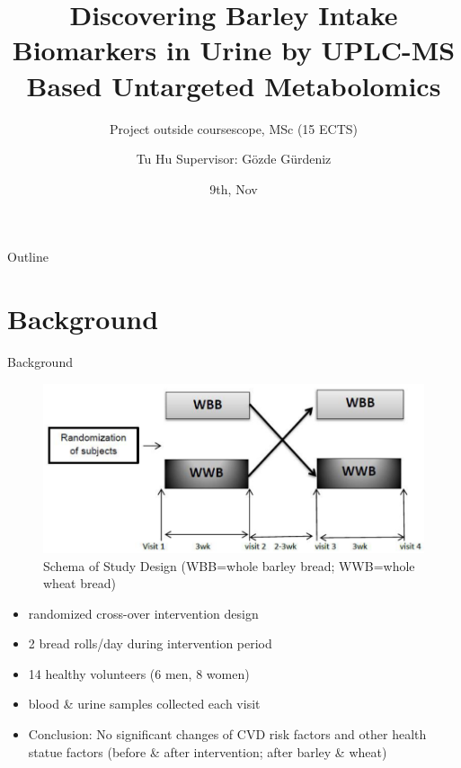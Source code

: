 \documentclass{beamer}
\title{Discovering Barley Intake Biomarkers in Urine by UPLC-MS Based Untargeted Metabolomics}
\subtitle{Project outside coursescope, MSc (15 ECTS)}
\author{Tu Hu \newline \tiny{ Supervisor: Gözde Gürdeniz}}
\institute{University of Copenhagen}
\date{9th, Nov}
\begin{document}
\begin{frame}
  \titlepage
\end{frame}

\begin{frame}{Outline}
  \tableofcontents
\end{frame}

\section{Background}
 \begin{frame}{Background}
 \begin{figure}[h]
    \centering
    \includegraphics[scale=0.3]{images/studes.PNG}
    \caption{Schema of Study Design (WBB=whole barley bread; WWB=whole wheat bread)}
        \label{fig:studes}
\end{figure}

\begin{itemize}
\item randomized cross-over intervention design
\item 2 bread rolls/day during intervention period
\item 14 healthy volunteers (6 men, 8 women)
\item blood \& urine samples collected each visit
\item Conclusion: No significant changes of CVD risk factors and other health statue factors (before \& after intervention; after barley \& wheat)
\end{itemize}
 \end{frame}
 
\end{document}
